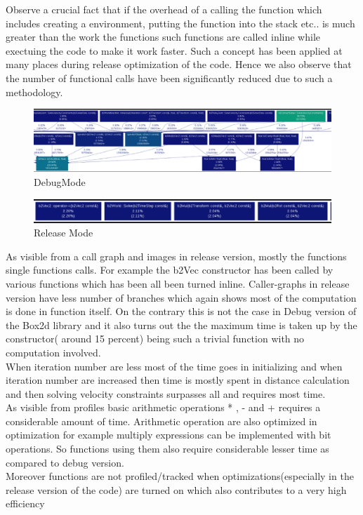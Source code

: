\documentclass[a4paper,11pt]{article}
\begin{document}
Observe a crucial fact that if the overhead of a calling the function which includes creating a environment, putting the function into the stack etc.. is much greater than the work the functions such functions are called inline while exectuing the code to make it work faster. Such a concept has been applied at many places during release optimization of the code. 
Hence we also observe that the number of functional calls have been significantly reduced due to such a methodology.\\
\begin{figure}[ht]
	\includegraphics[width=180mm]{3.eps}
	\caption{DebugMode}			
\end{figure}
\begin{figure}[ht]
	\includegraphics[width=180mm]{4.eps}
	\caption{Release Mode}			
\end{figure}
As visible from a call graph and images in release version, mostly the functions single functions calls.
For example  the b2Vec constructor has been called by various functions which has been  all been turned inline.
Caller-graphs in release version have less number of branches which again shows most of the computation is done in function itself. On the contrary this is not the case in Debug version of the Box2d library and it also turns out the the maximum time is taken up by the constructor( around 15 percent) being such a trivial function with no computation involved.\\
When iteration number are less most of the time goes in initializing and when iteration number are increased then time is mostly spent in distance calculation and then solving velocity constraints surpasses all and requires most time.\\

As visible from profiles basic arithmetic operations * , - and + requires a considerable amount of time. Arithmetic operation are also optimized in optimization for example multiply expressions can be implemented with bit operations. So functions using them also require considerable lesser time as compared to debug version.
\\
Moreover functions are not profiled/tracked when optimizations(especially in the release version of the code) are turned on which also contributes to a very high efficiency
\\
\end{document}
